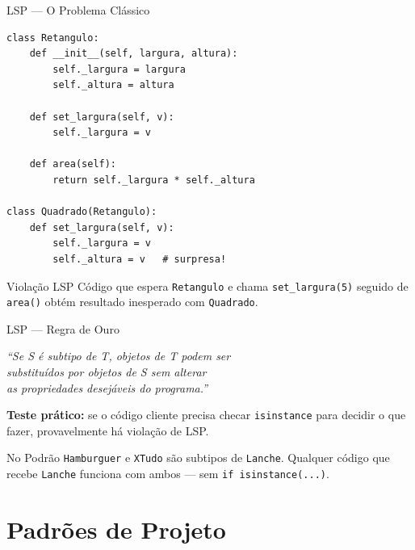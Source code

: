 \documentclass[aspectratio=169]{beamer}
\begin{document}
\begin{frame}{LSP --- O Problema Clássico}
\begin{lstlisting}
class Retangulo:
    def __init__(self, largura, altura):
        self._largura = largura
        self._altura = altura

    def set_largura(self, v):
        self._largura = v

    def area(self):
        return self._largura * self._altura

class Quadrado(Retangulo):
    def set_largura(self, v):
        self._largura = v
        self._altura = v   # surpresa!
\end{lstlisting}

\begin{alertblock}{Violação LSP}
Código que espera \texttt{Retangulo} e chama \texttt{set\_largura(5)} seguido de \texttt{area()} obtém resultado inesperado com \texttt{Quadrado}.
\end{alertblock}
\end{frame}

\begin{frame}{LSP --- Regra de Ouro}
\begin{center}
\Large
\textit{``Se S é subtipo de T, objetos de T podem ser\\
substituídos por objetos de S sem alterar\\
as propriedades desejáveis do programa.''}
\end{center}

\vspace{0.5cm}

\textbf{Teste prático:} se o código cliente precisa checar \texttt{isinstance} para decidir o que fazer, provavelmente há violação de LSP.

\begin{exampleblock}{No Podrão}
\texttt{Hamburguer} e \texttt{XTudo} são subtipos de \texttt{Lanche}. Qualquer código que recebe \texttt{Lanche} funciona com ambos --- sem \texttt{if isinstance(...)}.
\end{exampleblock}
\end{frame}

\section{Padrões de Projeto}
\end{document}
